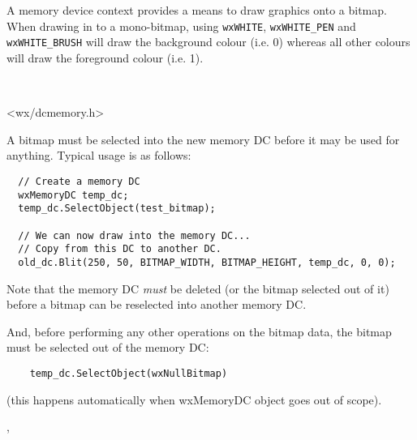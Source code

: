 \section{}\label{wxmemorydc}

A memory device context provides a means to draw graphics onto a bitmap. When
drawing in to a mono-bitmap, using {\tt wxWHITE}, {\tt wxWHITE\_PEN} and
{\tt wxWHITE\_BRUSH}
will draw the background colour (i.e. 0) whereas all other colours will draw the
foreground colour (i.e. 1).


\\


<wx/dcmemory.h>




A bitmap must be selected into the new memory DC before it may be used
for anything.  Typical usage is as follows:

\begin{verbatim}
  // Create a memory DC
  wxMemoryDC temp_dc;
  temp_dc.SelectObject(test_bitmap);

  // We can now draw into the memory DC...
  // Copy from this DC to another DC.
  old_dc.Blit(250, 50, BITMAP_WIDTH, BITMAP_HEIGHT, temp_dc, 0, 0);
\end{verbatim}

Note that the memory DC {\it must} be deleted (or the bitmap selected out of it) before a bitmap
can be reselected into another memory DC.

And, before performing any other operations on the bitmap data, the bitmap must
be selected out of the memory DC:

\begin{verbatim}
    temp_dc.SelectObject(wxNullBitmap)
\end{verbatim}

(this happens automatically when wxMemoryDC object goes out of scope).



, 


\label{wxmemorydcctor}

